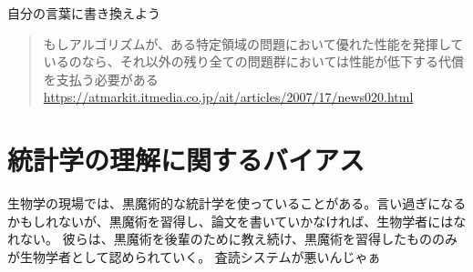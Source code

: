 自分の言葉に書き換えよう
\begin{quote}
    もしアルゴリズムが、ある特定領域の問題において優れた性能を発揮しているのなら、それ以外の残り全ての問題群においては性能が低下する代償を支払う必要がある
    \url{https://atmarkit.itmedia.co.jp/ait/articles/2007/17/news020.html}    
\end{quote}
\fi 


\section{統計学の理解に関するバイアス}
生物学の現場では、黒魔術的な統計学を使っていることがある。言い過ぎになるかもしれないが、黒魔術を習得し、論文を書いていかなければ、生物学者にはなれない。
彼らは、黒魔術を後輩のために教え続け、黒魔術を習得したもののみが生物学者として認められていく。
査読システムが悪いんじゃぁ

\fi

